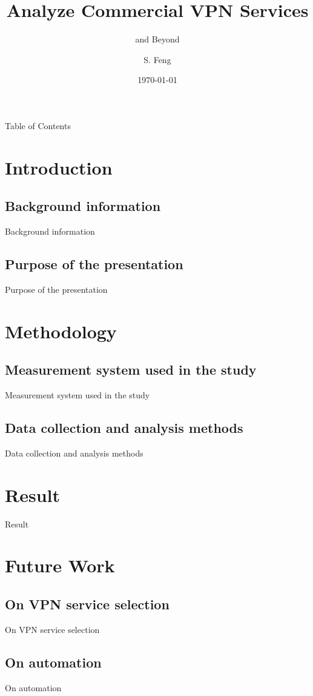 \documentclass{beamer}
\title{Analyze Commercial VPN Services}
\subtitle[]{and Beyond}
\author[Feng, Shuo]{S. Feng}
\institute{NIMS Lab}
\date{\today}
\begin{document}
\frame{\titlepage}

\begin{frame}{Table of Contents}
  \tableofcontents
\end{frame}

\section{Introduction}
\subsection{Background information}
\begin{frame}{Background information}
\end{frame}

\subsection{Purpose of the presentation}
\begin{frame}{Purpose of the presentation}
\end{frame}

\section{Methodology}
\subsection{Measurement system used in the study}
\begin{frame}{Measurement system used in the study}
\end{frame}

\subsection{Data collection and analysis methods}
\begin{frame}{Data collection and analysis methods}
\end{frame}

\section{Result}
\begin{frame}{Result}
\end{frame}

\section{Future Work}
\subsection{On VPN service selection}
\begin{frame}{On VPN service selection}
\end{frame}

\subsection{On automation}
\begin{frame}{On automation}
\end{frame}
\end{document}
